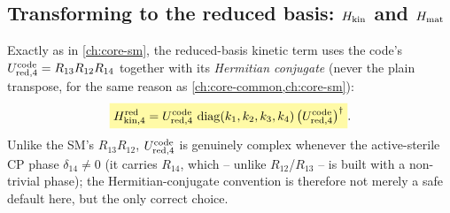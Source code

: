 \begin{theorybox}
\subsection*{Transforming to the reduced basis: $H_{\rm kin}$ and $H_{\rm mat}$}
Exactly as in \cref{ch:core-sm}, the reduced-basis kinetic term uses the
code's $U_{\rm red,4}^{\rm code}=R_{13}R_{12}R_{14}$ together with its
\emph{Hermitian conjugate} (never the plain transpose, for the same reason
as \cref{ch:core-common,ch:core-sm}):
\begin{equation}
  \keyresult{H_{\rm kin,4}^{\rm red} = U_{\rm red,4}^{\rm code}\,\diag(k_1,k_2,k_3,k_4)\,\bigl(U_{\rm red,4}^{\rm code}\bigr)^\dagger}.
\end{equation}
Unlike the SM's $R_{13}R_{12}$, $U_{\rm red,4}^{\rm code}$ is genuinely
complex whenever the active-sterile CP phase $\delta_{14}\neq0$ (it carries
$R_{14}$, which -- unlike $R_{12}$/$R_{13}$ -- is built with a non-trivial
phase); the Hermitian-conjugate convention is therefore not merely a safe
default here, but the only correct choice.


\end{theorybox}
